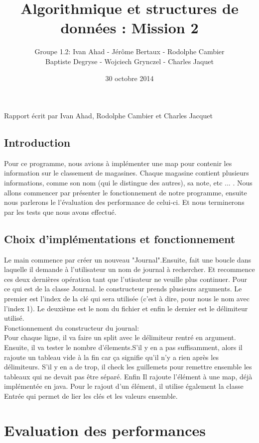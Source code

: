 \documentclass[a4paper]{article}
\title{Algorithmique et structures de données : Mission 2}
\date{30 octobre 2014}
\author{Groupe 1.2: Ivan Ahad - Jérôme Bertaux - Rodolphe Cambier \\ 
	Baptiste Degryse - Wojciech Grynczel - Charles Jaquet}
\begin{document}
\maketitle



Rapport écrit par Ivan Ahad, Rodolphe Cambier et Charles Jacquet

\subsection*{Introduction}
Pour ce programme, nous avions à implémenter une map pour contenir les information sur le classement de magasines. Chaque magasine contient plusieurs informations, comme son nom (qui le distingue des autres), sa note, etc ... .
Nous allons commencer par présenter le fonctionnement de notre programme, ensuite nous parlerons le l'évaluation des performance de celui-ci. Et nous terminerons par les tests que nous avons effectué.

\subsection*{Choix d'implémentations et fonctionnement}
Le main commence par créer un nouveau "Journal".Ensuite, fait une boucle dans laquelle il demande à l'utilisateur un nom de journal à rechercher.
Et recommence ces deux dernières opération tant que l'utisateur ne veuille plus continuer.
Pour ce qui est de la classe Journal. le constructeur prends plusieurs arguments. Le premier est l'index de la clé qui sera utilisée (c'est à dire, pour nous le nom avec l'index 1). Le deuxième est le nom du fichier et enfin le dernier est le délimiteur utilisé.\\
Fonctionnement du constructeur du journal:\\
Pour chaque ligne, il va faire un split avec le délimiteur rentré en argument. Ensuite, il va tester le nombre d'élements.S'il y en a pas suffisamment, alors il rajoute un tableau vide à la fin car ça signifie qu'il n'y a rien après les délimiteurs. S'il y en a de trop, il check les guillemets pour remettre ensemble les tableaux qui ne devait pas être séparé. Enfin Il rajoute l'élément à une map, déjà implémentée en java. Pour le rajout d'un élément, il utilise également la classe Entrée qui permet de lier les clés et les valeurs ensemble.

\section*{Evaluation des performances}
\end{document}

